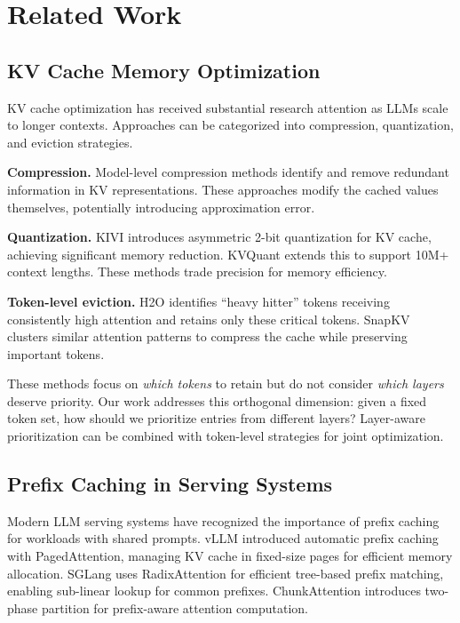 \documentclass[10pt,conference]{IEEEtran}
\begin{document}
\section{Related Work}

\subsection{KV Cache Memory Optimization}

KV cache optimization has received substantial research attention as LLMs scale to longer contexts. Approaches can be categorized into compression, quantization, and eviction strategies.

\textbf{Compression.} Model-level compression methods \cite{ge2023model} identify and remove redundant information in KV representations. These approaches modify the cached values themselves, potentially introducing approximation error.

\textbf{Quantization.} KIVI \cite{liu2024kivi} introduces asymmetric 2-bit quantization for KV cache, achieving significant memory reduction. KVQuant \cite{hooper2024kvquant} extends this to support 10M+ context lengths. These methods trade precision for memory efficiency.

\textbf{Token-level eviction.} H2O \cite{zhang2024h2o} identifies ``heavy hitter'' tokens receiving consistently high attention and retains only these critical tokens. SnapKV \cite{snapkv2024} clusters similar attention patterns to compress the cache while preserving important tokens.

These methods focus on \emph{which tokens} to retain but do not consider \emph{which layers} deserve priority. Our work addresses this orthogonal dimension: given a fixed token set, how should we prioritize entries from different layers? Layer-aware prioritization can be combined with token-level strategies for joint optimization.

\subsection{Prefix Caching in Serving Systems}

Modern LLM serving systems have recognized the importance of prefix caching for workloads with shared prompts. vLLM \cite{kwon2023efficient} introduced automatic prefix caching with PagedAttention, managing KV cache in fixed-size pages for efficient memory allocation. SGLang \cite{zheng2023efficiently} uses RadixAttention for efficient tree-based prefix matching, enabling sub-linear lookup for common prefixes. ChunkAttention \cite{ye2024chunkattention} introduces two-phase partition for prefix-aware attention computation.
\end{document}
